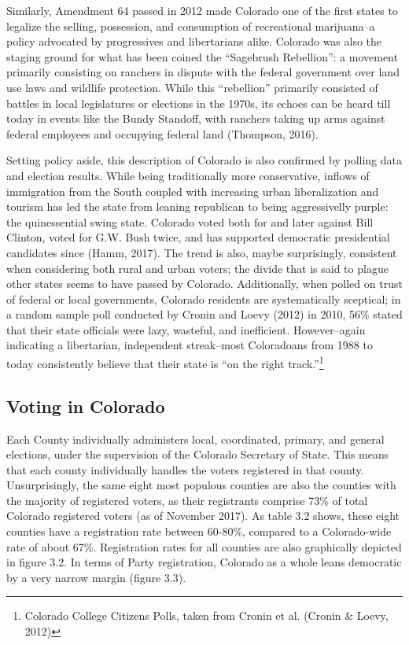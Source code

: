 \documentclass[12pt,twoside]{reedthesis}
\begin{document}
  Similarly, Amendment 64 passed in 2012 made Colorado one of the first
  states to legalize the selling, possession, and consumption of
  recreational marijuana--a policy advocated by progressives and
  libertarians alike. Colorado was also the staging ground for what has
  been coined the ``Sagebrush Rebellion'': a movement primarily consisting
  on ranchers in dispute with the federal government over land use laws
  and wildlife protection. While this ``rebellion'' primarily consisted of
  battles in local legislatures or elections in the 1970s, its echoes can
  be heard till today in events like the Bundy Standoff, with ranchers
  taking up arms against federal employees and occupying federal land
  (Thompson, 2016).
  
  Setting policy aside, this description of Colorado is also confirmed by
  polling data and election results. While being traditionally more
  conservative, inflows of immigration from the South coupled with
  increasing urban liberalization and tourism has led the state from
  leaning republican to being aggressivelly purple: the quinessential
  swing state. Colorado voted both for and later against Bill Clinton,
  voted for G.W. Bush twice, and has supported democratic presidential
  candidates since (Hamm, 2017). The trend is also, maybe surprisingly,
  consistent when considering both rural and urban voters; the divide that
  is said to plague other states seems to have passed by Colorado.
  Additionally, when polled on trust of federal or local governments,
  Colorado residents are systematically sceptical; in a random sample poll
  conducted by Cronin and Loevy (2012) in 2010, 56\% stated that their
  state officials were lazy, wasteful, and inefficient. However--again
  indicating a libertarian, independent streak--most Coloradoans from 1988
  to today consistently believe that their state is ``on the right
  track.''\footnote{Colorado College Citizens Polls, taken from Cronin et
    al. (Cronin \& Loevy, 2012)}
  
  \subsection{Voting in Colorado}\label{voting-in-colorado}
  
  Each County individually administers local, coordinated, primary, and
  general elections, under the supervision of the Colorado Secretary of
  State. This means that each county individually handles the voters
  registered in that county. Unsurprisingly, the same eight most populous
  counties are also the counties with the majority of registered voters,
  as their registrants comprise 73\% of total Colorado registered voters
  (as of November 2017). As table 3.2 shows, these eight counties have a
  registration rate between 60-80\%, compared to a Colorado-wide rate of
  about 67\%. Registration rates for all counties are also graphically
  depicted in figure 3.2. In terms of Party registration, Colorado as a
  whole leans democratic by a very narrow margin (figure 3.3).
  
\end{document}
